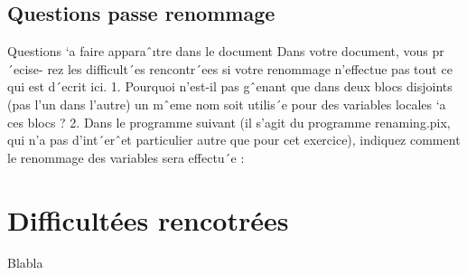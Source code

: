 \documentclass{report}
\begin{document}
    \section*{Questions passe renommage}
    Questions `a faire apparaˆıtre dans le document Dans votre document, vous pr´ecise-
    rez les difficult´es rencontr´ees si votre renommage n’effectue pas tout ce qui est d´ecrit ici.
    1. Pourquoi n’est-il pas gˆenant que dans deux blocs disjoints (pas l’un dans l’autre) un
    mˆeme nom soit utilis´e pour des variables locales `a ces blocs ?
    2. Dans le programme suivant (il s’agit du programme renaming.pix, qui n’a pas
    d’int´erˆet particulier autre que pour cet exercice), indiquez comment le renommage
    des variables sera effectu´e :


\chapter*{Difficultées rencotrées}
    Blabla
\end{document}
